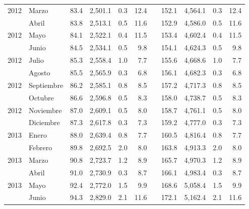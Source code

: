 \begin{center}
\begin{longtable}{llrrrrrrrrr}
		\multicolumn{1}{l}{	2012	}&	Marzo	&	 83.4 	&	 2,501.1 	&	 0.3 	&	 12.4 	&  &	 152.1 	&	 4,564.1 	&	 0.3 	&	 12.4 	\\
		\rowcolor{color1!5!white}\multicolumn{1}{l}{	2012	}&	Abril	&	 83.8 	&	 2,513.1 	&	 0.5 	&	 11.6 	&  &	 152.9 	&	 4,586.0 	&	 0.5 	&	 11.6 	\\
		\multicolumn{1}{l}{	2012	}&	Mayo	&	 84.1 	&	 2,522.1 	&	 0.4 	&	 11.5 	&  &	 153.4 	&	 4,602.4 	&	 0.4 	&	 11.5 	\\
		\rowcolor{color1!5!white}\multicolumn{1}{l}{	2012	}&	Junio	&	 84.5 	&	 2,534.1 	&	 0.5 	&	 9.8 	&  &	 154.1 	&	 4,624.3 	&	 0.5 	&	 9.8 	\\
		\multicolumn{1}{l}{	2012	}&	Julio	&	 85.3 	&	 2,558.4 	&	 1.0 	&	 7.7 	&  &	 155.6 	&	 4,668.6 	&	 1.0 	&	 7.7 	\\
		\rowcolor{color1!5!white}\multicolumn{1}{l}{	2012	}&	Agosto	&	 85.5 	&	 2,565.9 	&	 0.3 	&	 6.8 	&  &	 156.1 	&	 4,682.3 	&	 0.3 	&	 6.8 	\\
		\multicolumn{1}{l}{	2012	}&	Septiembre	&	 86.2 	&	 2,585.1 	&	 0.8 	&	 8.5 	&  &	 157.2 	&	 4,717.3 	&	 0.8 	&	 8.5 	\\
		\rowcolor{color1!5!white}\multicolumn{1}{l}{	2012	}&	Octubre	&	 86.6 	&	 2,596.8 	&	 0.5 	&	 8.3 	&  &	 158.0 	&	 4,738.7 	&	 0.5 	&	 8.3 	\\
		\multicolumn{1}{l}{	2012	}&	Noviembre	&	 87.0 	&	 2,609.1 	&	 0.5 	&	 8.0 	&  &	 158.7 	&	 4,761.1 	&	 0.5 	&	 8.0 	\\
		\rowcolor{color1!5!white}\multicolumn{1}{l}{	2012	}&	Diciembre	&	 87.3 	&	 2,617.8 	&	 0.3 	&	 7.3 	&  &	 159.2 	&	 4,777.0 	&	 0.3 	&	 7.3 	\\
		\multicolumn{1}{l}{	2013	}&	Enero	&	 88.0 	&	 2,639.4 	&	 0.8 	&	 7.7 	&  &	 160.5 	&	 4,816.4 	&	 0.8 	&	 7.7 	\\
		\rowcolor{color1!5!white}\multicolumn{1}{l}{	2013	}&	Febrero	&	 89.8 	&	 2,692.5 	&	 2.0 	&	 8.0 	&  &	 163.8 	&	 4,913.3 	&	 2.0 	&	 8.0 	\\
		\multicolumn{1}{l}{	2013	}&	Marzo	&	 90.8 	&	 2,723.7 	&	 1.2 	&	 8.9 	&  &	 165.7 	&	 4,970.3 	&	 1.2 	&	 8.9 	\\
		\rowcolor{color1!5!white}\multicolumn{1}{l}{	2013	}&	Abril	&	 91.0 	&	 2,730.9 	&	 0.3 	&	 8.7 	&  &	 166.1 	&	 4,983.4 	&	 0.3 	&	 8.7 	\\
		\multicolumn{1}{l}{	2013	}&	Mayo	&	 92.4 	&	 2,772.0 	&	 1.5 	&	 9.9 	&  &	 168.6 	&	 5,058.4 	&	 1.5 	&	 9.9 	\\
		\rowcolor{color1!5!white}\multicolumn{1}{l}{	2013	}&	Junio	&	 94.3 	&	 2,829.0 	&	 2.1 	&	 11.6 	&  &	 172.1 	&	 5,162.4 	&	 2.1 	&	 11.6 	\\

\end{longtable}
\end{center}
